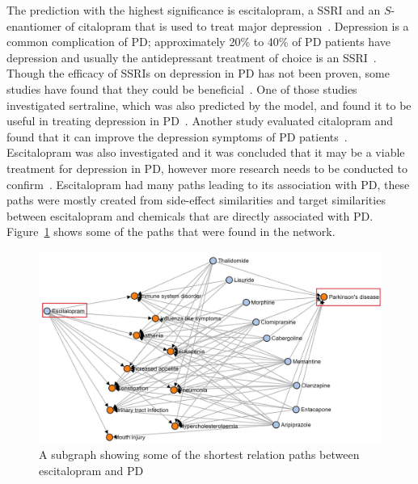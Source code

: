 The prediction with the highest significance is escitalopram, a \ac{SSRI} and an $S$-enantiomer of citalopram that is used to treat major depression~\cite{weintraub_escitalopram_2006}.
Depression is a common complication of \ac{PD}; approximately 20\% to 40\% of \ac{PD} patients have depression and usually the antidepressant treatment of choice is an \ac{SSRI}~\cite{weintraub_escitalopram_2006}.
Though the efficacy of \ac{SSRI}s on depression in \ac{PD} has not been proven, some studies have found that they could be beneficial~\cite{rampello_ssri_2002, hauser_sertraline_1997, ceravolo_paroxetine_2000, menza_citalopram_2004}.
One of those studies investigated sertraline, which was also predicted by the model, and found it to be useful in treating depression in \ac{PD}~\cite{hauser_sertraline_1997}.
Another study evaluated citalopram and found that it can improve the depression symptoms of \ac{PD} patients~\cite{menza_citalopram_2004}.
Escitalopram was also investigated and it was concluded that it may be a viable treatment for depression in \ac{PD}, however more research needs to be conducted to confirm~\cite{weintraub_escitalopram_2006, verma_efficacy_2012}.
Escitalopram had many paths leading to its association with \ac{PD}, these paths were mostly created from side-effect similarities and target similarities between escitalopram and chemicals that are directly associated with \ac{PD}.
Figure~\ref{fig:parkinson_escitalopram} shows some of the paths that were found in the network.

\begin{figure}[h!]
    \centering
    \includegraphics[scale=0.6]
    {figures/parkinson_escitalopram.jpg}
    \caption [Escitalopram path subgraph in Parkinson's disease]{\label{fig:parkinson_escitalopram} A subgraph showing some of the shortest relation paths between escitalopram and \ac{PD}}
\end{figure}

